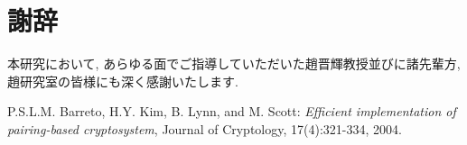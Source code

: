\documentclass[twocolumn]{jsarticle} %
\begin{document}
\section*{謝辞}
本研究において, あらゆる面でご指導していただいた趙晋輝教授並びに諸先輩方, 趙研究室の皆様にも深く感謝いたします.

\begin{thebibliography}{99}
 P.S.L.M. Barreto, H.Y. Kim, B. Lynn, and M. Scott: {\em Efficient implementation of pairing-based cryptosystem}, Journal of Cryptology, 17(4):321-334, 2004.
\end{thebibliography}

\end{document}
